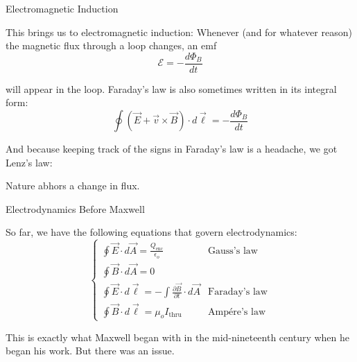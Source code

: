 \documentclass{beamer}
\begin{document}
\begin{frame}{Electromagnetic Induction}

This brings us to electromagnetic induction: Whenever (and for whatever reason) the magnetic flux through a loop changes, an emf
\begin{equation*}
    \mathcal{E} = -\frac{d\Phi_B}{dt}
\end{equation*}

will appear in the loop. Faraday's law is also sometimes written in its integral form:
\begin{equation*}
    \boxed{\oint \left( \vec{E} + \vec{v} \times \vec{B} \right) \cdot d\vec{\ell} = -\frac{d\Phi_B}{dt}}
\end{equation*}

\vfill

And because keeping track of the signs in Faraday's law is a headache, we got Lenz's law:
\begin{center}
    Nature abhors a change in flux.
\end{center}

\end{frame}

\begin{frame}{Electrodynamics Before Maxwell}

So far, we have the following equations that govern electrodynamics:
\begin{equation*}
    \begin{cases} \displaystyle \oint \vec{E} \cdot d\vec{A} = \frac{Q_{\text{enc}}}{\epsilon_o} & \text{Gauss's law} \\[1.0em] \displaystyle \oint \vec{B} \cdot d\vec{A} = 0 & \text{} \\[1.0em] \displaystyle \oint \vec{E} \cdot d\vec{\ell} = - \int \frac{\partial \vec{B}}{\partial t} \cdot d\vec{A} & \text{Faraday's law} \\[1.0em] \displaystyle \oint \vec{B} \cdot d\vec{\ell} = \mu_o I_{\text{thru}} & \text{Amp{\'e}re's law} \end{cases}
\end{equation*}

This is exactly what Maxwell began with in the mid-nineteenth century when he began his work. But there was an issue.

\end{frame}
\end{document}
